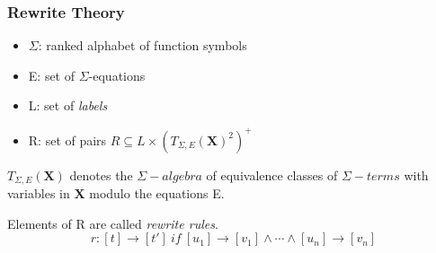 \documentclass{beamer}
\begin{document}
\begin{frame}
    \frametitle{Rewrite Theory}
    \begin{center}
    \end{center}
    
    \bigskip
    \begin{itemize}

        \item $\Sigma$: ranked alphabet of function symbols
        
        \item E: set  of $\Sigma$-equations 
       
        \item L: set of \emph{labels}
      
        \item R: set of pairs $R \subseteq L \times (T_{\Sigma, E}(\mathbf{X})^2)^+$
    \end{itemize}
    
    \bigskip
    $T_{\Sigma,E}(\mathbf{X})$ denotes the $\Sigma-algebra$ of equivalence classes of $\Sigma-terms$ with variables in $\mathbf{X}$ modulo the equations E.
    
    \medskip
    Elements of R are called \emph{rewrite rules}.
    $$r: [t] \rightarrow [t']\ if\ [u_1] \rightarrow [v_1] \wedge \cdots \wedge [u_n] \rightarrow [v_n]$$
\end{frame}


  
 
\end{document}
